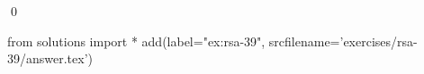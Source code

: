 
\begin{ex} 
  \label{ex:rsa-39}
  
  \qed
\end{ex} 
\begin{python0}
from solutions import *
add(label="ex:rsa-39",
    srcfilename='exercises/rsa-39/answer.tex') 
\end{python0}
